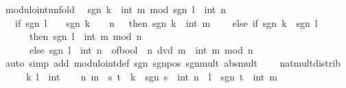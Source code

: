 \begin{isabellebody}
\isanewline
{}\isamarkupfalse%
\ modulo{\isacharunderscore}{\kern0pt}int{\isacharunderscore}{\kern0pt}unfold{\isacharcolon}{\kern0pt}\isanewline
\ \ {\isachardoublequoteopen}{\isacharparenleft}{\kern0pt}sgn\ k\ {\isacharasterisk}{\kern0pt}\ int\ m{\isacharparenright}{\kern0pt}\ mod\ {\isacharparenleft}{\kern0pt}sgn\ l\ {\isacharasterisk}{\kern0pt}\ int\ n{\isacharparenright}{\kern0pt}\ {\isacharequal}{\kern0pt}\isanewline
\ \ \ {\isacharparenleft}{\kern0pt}if\ sgn\ l\ {\isacharequal}{\kern0pt}\ {}\ {\isasymor}\ sgn\ k\ {\isacharequal}{\kern0pt}\ {}\ {\isasymor}\ n\ {\isacharequal}{\kern0pt}\ {}\ then\ sgn\ k\ {\isacharasterisk}{\kern0pt}\ int\ m\isanewline
\ \ \ \ else\ if\ sgn\ k\ {\isacharequal}{\kern0pt}\ sgn\ l\isanewline
\ \ \ \ \ \ then\ sgn\ l\ {\isacharasterisk}{\kern0pt}\ int\ {\isacharparenleft}{\kern0pt}m\ mod\ n{\isacharparenright}{\kern0pt}\isanewline
\ \ \ \ \ \ else\ sgn\ l\ {\isacharasterisk}{\kern0pt}\ {\isacharparenleft}{\kern0pt}int\ {\isacharparenleft}{\kern0pt}n\ {\isacharasterisk}{\kern0pt}\ of{\isacharunderscore}{\kern0pt}bool\ {\isacharparenleft}{\kern0pt}{\isasymnot}\ n\ dvd\ m{\isacharparenright}{\kern0pt}{\isacharparenright}{\kern0pt}\ {\isacharminus}{\kern0pt}\ int\ {\isacharparenleft}{\kern0pt}m\ mod\ n{\isacharparenright}{\kern0pt}{\isacharparenright}{\kern0pt}{\isacharparenright}{\kern0pt}{\isachardoublequoteclose}\isanewline
%
\isadelimproof
\ \ %
\endisadelimproof
%
\isatagproof
{}\isamarkupfalse%
\ {\isacharparenleft}{\kern0pt}auto\ simp\ add{\isacharcolon}{\kern0pt}\ modulo{\isacharunderscore}{\kern0pt}int{\isacharunderscore}{\kern0pt}def\ sgn{\isacharunderscore}{\kern0pt}{}{\isacharunderscore}{\kern0pt}{}\ sgn{\isacharunderscore}{\kern0pt}{}{\isacharunderscore}{\kern0pt}pos\ sgn{\isacharunderscore}{\kern0pt}mult\ abs{\isacharunderscore}{\kern0pt}mult\isanewline
\ \ \ \ nat{\isacharunderscore}{\kern0pt}mult{\isacharunderscore}{\kern0pt}distrib{\isacharparenright}{\kern0pt}%
\endisatagproof
{\isafoldproof}%
%
\isadelimproof
\isanewline
%
\endisadelimproof
\isanewline
{}\isamarkupfalse%
%
\isadelimproof
\ %
\endisadelimproof
%
\isatagproof
{}\isamarkupfalse%
\isanewline
\ \ \isamarkupfalse%
\ k\ l\ {\isacharcolon}{\kern0pt}{\isacharcolon}{\kern0pt}\ int\isanewline
\ \ \isamarkupfalse%
\ n\ m\ \ s\ t\ \ {\isachardoublequoteopen}k\ {\isacharequal}{\kern0pt}\ sgn\ s\ {\isacharasterisk}{\kern0pt}\ int\ n{\isachardoublequoteclose}\ \ {\isachardoublequoteopen}l\ {\isacharequal}{\kern0pt}\ sgn\ t\ {\isacharasterisk}{\kern0pt}\ int\ m{\isachardoublequoteclose}\ \isanewline

\end{isabellebody}
